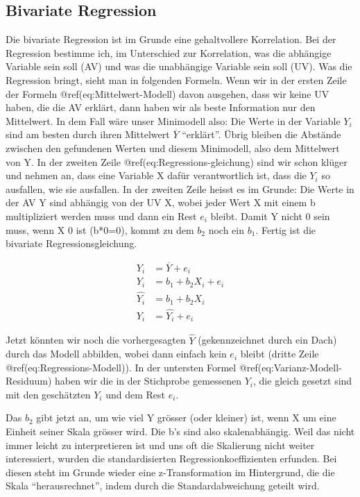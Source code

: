 \documentclass[
  10pt,
  letterpaper,
  a4paper, twoside]{scrreprt}
\begin{document}
\subsection{Bivariate Regression}\label{bivariate-regression}

Die bivariate Regression ist im Grunde eine gehaltvollere Korrelation.
Bei der Regression bestimme ich, im Unterschied zur Korrelation, was die
abhängige Variable sein soll (AV) und was die unabhängige Variable sein
soll (UV). Was die Regression bringt, sieht man in folgenden Formeln.
Wenn wir in der ersten Zeile der Formeln @ref(eq:Mittelwert-Modell)
davon ausgehen, dass wir keine UV haben, die die AV erklärt, dann haben
wir als beste Information nur den Mittelwert. In dem Fall wäre unser
Minimodell also: Die Werte in der Variable \(Y_i\) sind am besten durch
ihren Mittelwert \(\overline{Y}\) \enquote{erklärt}. Übrig bleiben die
Abstände zwischen den gefundenen Werten und diesem Minimodell, also dem
Mittelwert von Y. In der zweiten Zeile @ref(eq:Regressions-gleichung)
sind wir schon klüger und nehmen an, dass eine Variable X dafür
verantwortlich ist, dass die \(Y_i\) so ausfallen, wie sie ausfallen. In
der zweiten Zeile heisst es im Grunde: Die Werte in der AV Y sind
abhängig von der UV X, wobei jeder Wert X mit einem b multipliziert
werden muss und dann ein Rest \(e_i\) bleibt. Damit Y nicht 0 sein muss,
wenn X 0 ist (b*0=0), kommt zu dem \(b_2\) noch ein \(b_1\). Fertig ist
die bivariate Regressionsgleichung.

\begin{align}
  Y_i & = \overline{Y} + e_i  \label{eq:Mittelwert-Modell} \\
  Y_i & = b_1 + b_2X_i + e_i \label{eq:Regressions-gleichung} \\ 
  \hat{Y_i} & = b_1 + b_2X_i \label{eq:Regressions-Modell} \\
  Y_i & = \hat{Y_i}+e_i \label{eq:Varianz-Modell-Residuum}
\end{align}

Jetzt könnten wir noch die vorhergesagten \(\hat{Y}\) (gekennzeichnet
durch ein Dach) durch das Modell abbilden, wobei dann einfach kein
\(e_i\) bleibt (dritte Zeile @ref(eq:Regressions-Modell)). In der
untersten Formel @ref(eq:Varianz-Modell-Residuum) haben wir die in der
Stichprobe gemessenen \(Y_i\), die gleich gesetzt sind mit den
geschätzten \(Y_i\) und dem Rest \(e_i\).

Das \(b_2\) gibt jetzt an, um wie viel Y grösser (oder kleiner) ist,
wenn X um eine Einheit seiner Skala grösser wird. Die b's sind also
skalenabhängig. Weil das nicht immer leicht zu interpretieren ist und
uns oft die Skalierung nicht weiter interessiert, wurden die
standardisierten Regressionkoeffizienten erfunden. Bei diesen steht im
Grunde wieder eine z-Transformation im Hintergrund, die die Skala
\enquote{herausrechnet}, indem durch die Standardabweichung geteilt
wird.
\end{document}
